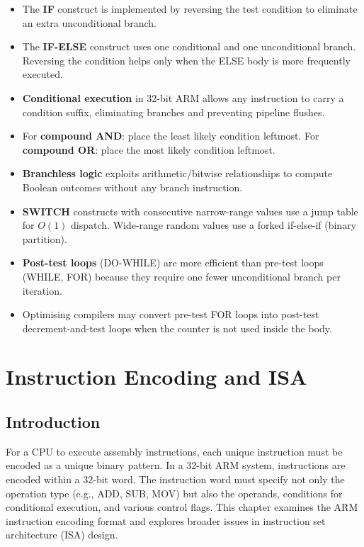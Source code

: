 \documentclass[11pt, a4paper, notitlepage]{report}
\theoremstyle{definition}
\theoremstyle{remark}
\theoremstyle{definition}
\begin{document}
\begin{itemize}
  \item The \textbf{IF} construct is implemented by reversing the test condition to eliminate an extra unconditional branch.
  \item The \textbf{IF-ELSE} construct uses one conditional and one unconditional branch. Reversing the condition helps only when the ELSE body is more frequently executed.
  \item \textbf{Conditional execution} in 32-bit ARM allows any instruction to carry a condition suffix, eliminating branches and preventing pipeline flushes.
  \item For \textbf{compound AND}: place the least likely condition leftmost. For \textbf{compound OR}: place the most likely condition leftmost.
  \item \textbf{Branchless logic} exploits arithmetic/bitwise relationships to compute Boolean outcomes without any branch instruction.
  \item \textbf{SWITCH} constructs with consecutive narrow-range values use a jump table for $O(1)$ dispatch. Wide-range random values use a forked if-else-if (binary partition).
  \item \textbf{Post-test loops} (DO-WHILE) are more efficient than pre-test loops (WHILE, FOR) because they require one fewer unconditional branch per iteration.
  \item Optimising compilers may convert pre-test FOR loops into post-test decrement-and-test loops when the counter is not used inside the body.
\end{itemize}

\chapter{Instruction Encoding and ISA}

\section{Introduction}

For a CPU to execute assembly instructions, each unique instruction must be encoded as a unique binary pattern. In a 32-bit ARM system, instructions are encoded within a 32-bit word. The instruction word must specify not only the operation type (e.g., ADD, SUB, MOV) but also the operands, conditions for conditional execution, and various control flags. This chapter examines the ARM instruction encoding format and explores broader issues in instruction set architecture (ISA) design.
\end{document}

